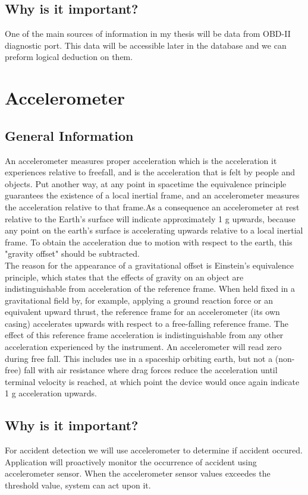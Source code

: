\subsection{Why is it important?}
One of the main sources of information in my thesis will be data from OBD-II diagnostic port. This data will be accessible later in the database and we can preform logical deduction on them.
\section{Accelerometer}
\subsection{General Information}
An accelerometer measures proper acceleration which is the acceleration it experiences relative to freefall, and is the acceleration that is felt by people and objects. Put another way, at any point in spacetime the equivalence principle guarantees the existence of a local inertial frame, and an accelerometer measures the acceleration relative to that frame.\cite{einstein_rel}As a consequence an accelerometer at rest relative to the Earth's surface will indicate approximately 1 g upwards, because any point on the earth's surface is accelerating upwards relative to a local inertial frame. To obtain the acceleration due to motion with respect to the earth, this "gravity offset" should be subtracted.\\
The reason for the appearance of a gravitational offset is Einstein's equivalence principle\cite{equivalence}, which states that the effects of gravity on an object are indistinguishable from acceleration of the reference frame. When held fixed in a gravitational field by, for example, applying a ground reaction force or an equivalent upward thrust, the reference frame for an accelerometer (its own casing) accelerates upwards with respect to a free-falling reference frame. The effect of this reference frame acceleration is indistinguishable from any other acceleration experienced by the instrument.
An accelerometer will read zero during free fall. This includes use in a spaceship orbiting earth, but not a (non-free) fall with air resistance where drag forces reduce the acceleration until terminal velocity is reached, at which point the device would once again indicate 1 g acceleration upwards.\\
\subsection{Why is it important?}
For accident detection we will use accelerometer to determine if accident occured\cite{accident}. Application will proactively monitor the occurrence of accident using accelerometer sensor. When the
accelerometer sensor values exceedes the threshold value, system can act upon it.




